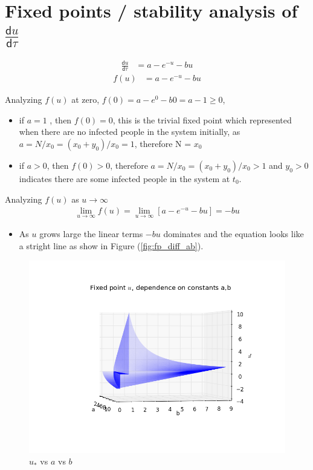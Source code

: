 \documentclass[a4paper]{article}
\begin{document}
\section{Fixed points / stability analysis of $\frac{\mathsf{d}u}{\mathsf{d}\tau}$}

\begin{align*}
  \frac{\mathsf{d}u}{\mathsf{d}\tau} &= a - e^{-u} - bu 			
\end{align*}
\begin{align*}
  f(u) &= a - e^{-u} - bu 							
\end{align*}

Analyzing $f(u)$ at zero, $f(0) = a - e^0 - b0 = a - 1 \geq 0$, 
\begin{itemize}
 \item if $a = 1$ , then $f(0) = 0$, this is the trivial fixed point which represented when there are no infected people in the system initially, as $a = N/x_{0} = (x_{0} + y_{0})/x_{0} = 1$, therefore N = $x_{0}$ 
 \item if $a > 0$, then $f(0) > 0$, therefore $a = N/x_{0} = (x_{0} + y_{0})/x_{0} > 1$ and $y_{0} > 0$ indicates there are some infected people in the system at $t_{0}$.
\end{itemize}

Analyzing $f(u)$ as $u\to\infty$ 
\begin{align}
  \label{b_anal}
  \lim_{u\to\infty} f(u) = \lim_{u\to\infty} [a - e^{-u} - bu] = -bu									
\end{align}
\begin{itemize}
 \item As $u$ grows large the linear terms $-bu$ dominates and the equation looks like a stright line as show in Figure (\ref{fig:fp_diff_ab}). 
\end{itemize}

\begin{figure}[H]
\centering
\includegraphics[width=1\textwidth]{3D_plot.png}
\caption{\label{fig:3d}$u_{*}$ vs $a$ vs $b$}
\end{figure}
\end{document}
